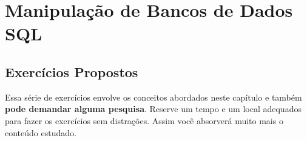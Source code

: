 \chapter{Manipulação de Bancos de Dados SQL}

\lipsum[1-1]

\section{Exercícios Propostos}

Essa série de exercícios envolve os conceitos abordados neste capítulo e também \textbf{pode demandar alguma pesquisa}. Reserve um tempo e um local adequados para fazer os exercícios sem distrações. Assim você absorverá muito mais o conteúdo estudado.